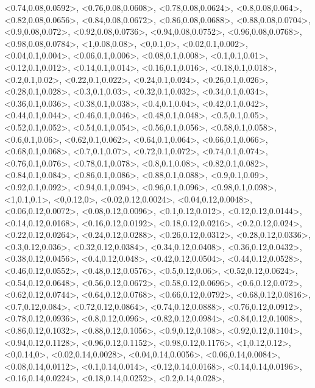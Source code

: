 \documentclass[a4paper,10pt]{article}
\begin{document}
\begin{eulernotebook}
\begin{euleroutput}
  <0.74,0.08,0.0592>,
  <0.76,0.08,0.0608>,
  <0.78,0.08,0.0624>,
  <0.8,0.08,0.064>,
  <0.82,0.08,0.0656>,
  <0.84,0.08,0.0672>,
  <0.86,0.08,0.0688>,
  <0.88,0.08,0.0704>,
  <0.9,0.08,0.072>,
  <0.92,0.08,0.0736>,
  <0.94,0.08,0.0752>,
  <0.96,0.08,0.0768>,
  <0.98,0.08,0.0784>,
  <1,0.08,0.08>,
  <0,0.1,0>,
  <0.02,0.1,0.002>,
  <0.04,0.1,0.004>,
  <0.06,0.1,0.006>,
  <0.08,0.1,0.008>,
  <0.1,0.1,0.01>,
  <0.12,0.1,0.012>,
  <0.14,0.1,0.014>,
  <0.16,0.1,0.016>,
  <0.18,0.1,0.018>,
  <0.2,0.1,0.02>,
  <0.22,0.1,0.022>,
  <0.24,0.1,0.024>,
  <0.26,0.1,0.026>,
  <0.28,0.1,0.028>,
  <0.3,0.1,0.03>,
  <0.32,0.1,0.032>,
  <0.34,0.1,0.034>,
  <0.36,0.1,0.036>,
  <0.38,0.1,0.038>,
  <0.4,0.1,0.04>,
  <0.42,0.1,0.042>,
  <0.44,0.1,0.044>,
  <0.46,0.1,0.046>,
  <0.48,0.1,0.048>,
  <0.5,0.1,0.05>,
  <0.52,0.1,0.052>,
  <0.54,0.1,0.054>,
  <0.56,0.1,0.056>,
  <0.58,0.1,0.058>,
  <0.6,0.1,0.06>,
  <0.62,0.1,0.062>,
  <0.64,0.1,0.064>,
  <0.66,0.1,0.066>,
  <0.68,0.1,0.068>,
  <0.7,0.1,0.07>,
  <0.72,0.1,0.072>,
  <0.74,0.1,0.074>,
  <0.76,0.1,0.076>,
  <0.78,0.1,0.078>,
  <0.8,0.1,0.08>,
  <0.82,0.1,0.082>,
  <0.84,0.1,0.084>,
  <0.86,0.1,0.086>,
  <0.88,0.1,0.088>,
  <0.9,0.1,0.09>,
  <0.92,0.1,0.092>,
  <0.94,0.1,0.094>,
  <0.96,0.1,0.096>,
  <0.98,0.1,0.098>,
  <1,0.1,0.1>,
  <0,0.12,0>,
  <0.02,0.12,0.0024>,
  <0.04,0.12,0.0048>,
  <0.06,0.12,0.0072>,
  <0.08,0.12,0.0096>,
  <0.1,0.12,0.012>,
  <0.12,0.12,0.0144>,
  <0.14,0.12,0.0168>,
  <0.16,0.12,0.0192>,
  <0.18,0.12,0.0216>,
  <0.2,0.12,0.024>,
  <0.22,0.12,0.0264>,
  <0.24,0.12,0.0288>,
  <0.26,0.12,0.0312>,
  <0.28,0.12,0.0336>,
  <0.3,0.12,0.036>,
  <0.32,0.12,0.0384>,
  <0.34,0.12,0.0408>,
  <0.36,0.12,0.0432>,
  <0.38,0.12,0.0456>,
  <0.4,0.12,0.048>,
  <0.42,0.12,0.0504>,
  <0.44,0.12,0.0528>,
  <0.46,0.12,0.0552>,
  <0.48,0.12,0.0576>,
  <0.5,0.12,0.06>,
  <0.52,0.12,0.0624>,
  <0.54,0.12,0.0648>,
  <0.56,0.12,0.0672>,
  <0.58,0.12,0.0696>,
  <0.6,0.12,0.072>,
  <0.62,0.12,0.0744>,
  <0.64,0.12,0.0768>,
  <0.66,0.12,0.0792>,
  <0.68,0.12,0.0816>,
  <0.7,0.12,0.084>,
  <0.72,0.12,0.0864>,
  <0.74,0.12,0.0888>,
  <0.76,0.12,0.0912>,
  <0.78,0.12,0.0936>,
  <0.8,0.12,0.096>,
  <0.82,0.12,0.0984>,
  <0.84,0.12,0.1008>,
  <0.86,0.12,0.1032>,
  <0.88,0.12,0.1056>,
  <0.9,0.12,0.108>,
  <0.92,0.12,0.1104>,
  <0.94,0.12,0.1128>,
  <0.96,0.12,0.1152>,
  <0.98,0.12,0.1176>,
  <1,0.12,0.12>,
  <0,0.14,0>,
  <0.02,0.14,0.0028>,
  <0.04,0.14,0.0056>,
  <0.06,0.14,0.0084>,
  <0.08,0.14,0.0112>,
  <0.1,0.14,0.014>,
  <0.12,0.14,0.0168>,
  <0.14,0.14,0.0196>,
  <0.16,0.14,0.0224>,
  <0.18,0.14,0.0252>,
  <0.2,0.14,0.028>,

\end{euleroutput}
\end{eulernotebook}
\end{document}
